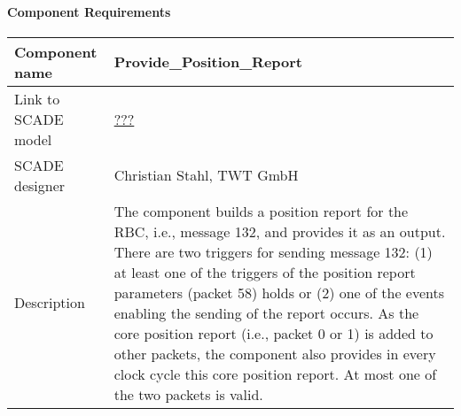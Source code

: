 
\paragraph{Component Requirements}

\begin{longtable}{p{}p{}}
\toprule
Component name			& Provide\_Position\_Report \\
\midrule
Link to SCADE model		& {\footnotesize \url{???}} \\
\midrule
SCADE designer			& Christian Stahl, TWT GmbH \\
\midrule
Description				&  The component builds a position report for the RBC, i.e., message 132, and provides it as an output.  There are two triggers for sending message 132:  (1) at least
one of the triggers of the position report parameters (packet 58) holds or 
(2) one of the events enabling the sending of the report occurs.
As the core position report (i.e., packet 0 or 1) is added to other packets, the
component also provides in every clock cycle this core position report. At most one of the two packets is valid.


\end{longtable}
